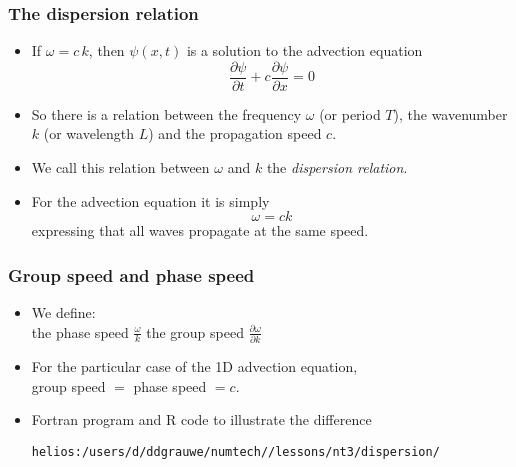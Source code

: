 \documentclass[aspectratio=43,9pt]{beamer}
\begin{document}
%
%
\begin{frame}
	\frametitle{The dispersion relation}
	\vfill\begin{itemize}
		\item If $\omega=c\,k$,	then $\psi(x,t)$ is a solution to the advection equation
			\begin{equation*}
				\frac{\partial \psi}{\partial t}+c\frac{\partial \psi}{\partial x}=0
			\end{equation*}\vfill
		\item So there is a relation between the frequency $\omega$ (or period $T$), the wavenumber $k$ (or wavelength $L$) and the propagation speed $c$.\vfill
		\item We call this relation between $\omega$ and $k$ the \emph{dispersion relation}.\vfill
		\item For the advection equation it is simply
			\begin{equation*}
				\omega = c k
			\end{equation*}
			expressing that all waves propagate at the same speed.
	\end{itemize}\vfill
\end{frame}
%
%
\begin{frame}
	\frametitle{Group speed and phase speed}
	\vfill\begin{itemize}
		\item We define:\\[2ex]
			\qquad the phase speed $\displaystyle\frac{\omega}k$
			\qquad the group speed $\displaystyle\frac{\partial \omega}{\partial k}$\vfill
		\item For the particular case of the 1D advection equation,\\[2ex]
			group speed $=$ phase speed $=c$.\vfill
		\item Fortran program and R code to illustrate the difference
			\par
			\texttt{helios:/users/d/ddgrauwe/numtech/\unskip/lessons/nt3/dispersion/}
	\end{itemize}\vfill
\end{frame}
%
%
\end{document}
